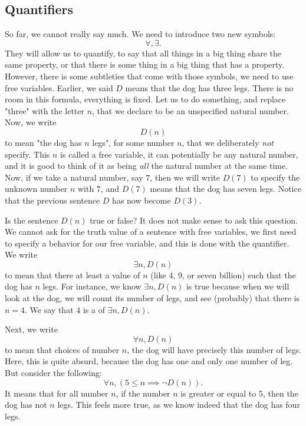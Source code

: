 \subsection{Quantifiers}

So far, we cannot really say much. We need to introduce two new symbols:
\begin{equation*}
    \forall, \exists.
\end{equation*}
They will allow us to quantify, to say that all things in a big thing share the same property, or that there is some thing in a big thing that has a property. However, there is some subtleties that come with those symbols, we need to use free variables. Earlier, we said \( D \) means that the dog has three legs. There is no room in this formula, everything is fixed. Let us to do something, and replace "three" with the letter \( n \), that we declare to be an unspecified natural number. Now, we write 
\begin{equation*}
    D(n)
\end{equation*}  
to mean "the dog has \( n \) legs", for some number \( n \), that we deliberately \textit{not} specify. This \( n \) is called a free variable, it can potentially be any natural number, and it is good to think of it as being \textit{all} the natural number at the same time. Now, if we take a natural number, say \( 7 \), then we will write \( D(7) \) to specify the unknown number \( n \) with 7, and \( D(7) \) means that the dog has seven legs. Notice that the previous sentence \( D \) has now become \( D(3) \). 

Is the sentence \( D(n) \) true or false? It does not make sense to ask this question. We cannot ask for the truth value of a sentence with free variables, we first need to specify a behavi\label{introduction}or for our free variable, and this is done with the quantifier. We write
\begin{equation*}
    \exists n, D(n)
\end{equation*}
to mean that there  at least a value of \( n \) (like 4, 9, or seven billion) such that the dog has \( n \) legs. For instance, we know \( \exists n, D(n) \) is true because when we will look at the dog, we will count its number of legs, and see (probably) that there is \( n = 4 \). We say that \( 4 \) is a  of \( \exists n, D(n) \). 

Next, we write
\begin{equation*}
    \forall n, D(n)
\end{equation*}
to mean that  choices of number \( n \), the dog will have precisely this number of legs. Here, this is quite absurd, because the dog has one and only one number of leg. But consider the following:
\begin{equation*}
    \forall n, (5 \leq n \implies \neg D(n)).
\end{equation*} 
It means that for all number \( n \), if the number \( n \) is greater or equal to 5, then the dog has not \( n \) legs. This feels more true, as we know indeed that the dog has four legs. 

